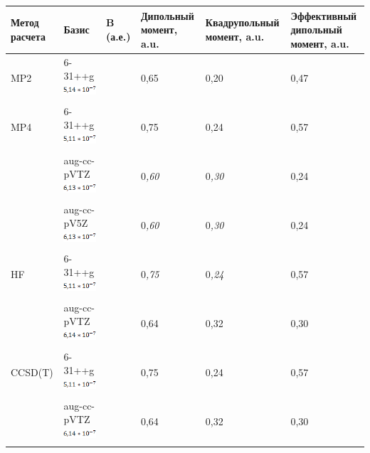 \documentclass{article}
\begin{document}
\vspace{10pt}
\begin{tabular}{|>{\raggedright}p{25pt}|>{\raggedright}p{42pt}|>{\raggedright}p{50pt}|>{\raggedright}p{49pt}|>{\raggedright}p{52pt}|>{\raggedright}p{53pt}|}
\hline
М\textbf{етод расчета} & Б\textbf{азис} & B\textbf{ (а.е.)} & Д\textbf{ипольный 
момент, a.u.} & К\textbf{вадрупольный момент, a.u.} & Э\textbf{ффективный 
дипольный момент, a.u.}\tabularnewline
\hline
MP2 & 6-31++g
\includegraphics[width=54pt, height=15pt, keepaspectratio=true]{7-fig001.png}
 &  & 0,65 & 0,20 & 0,47\tabularnewline
\hline
MP4 & 6-31++g
\includegraphics[width=54pt, height=15pt, keepaspectratio=true]{7-fig002.png}
 &  & 0,75 & 0,24 & 0,57\tabularnewline
\hline
 & aug-cc-pVTZ
\includegraphics[width=54pt, height=15pt, keepaspectratio=true]{7-fig003.png}
 &  & 0\textit{,60} & 0\textit{,30} & 0,24\tabularnewline
\hline
 & aug-cc-pV5Z
\includegraphics[width=54pt, height=15pt, keepaspectratio=true]{7-fig004.png}
 &  & 0\textit{,60} & 0\textit{,30} & 0,24\tabularnewline
\hline
HF & 6-31++g
\includegraphics[width=54pt, height=15pt, keepaspectratio=true]{7-fig005.png}
 &  & 0\textit{,75} & 0\textit{,24} & 0,57\tabularnewline
\hline
 & aug-cc-pVTZ
\includegraphics[width=54pt, height=15pt, keepaspectratio=true]{7-fig006.png}
 &  & 0,64 & 0,32 & 0,30\tabularnewline
\hline
CCSD(T) & 6-31++g
\includegraphics[width=54pt, height=15pt, keepaspectratio=true]{7-fig007.png}
 &  & 0,75 & 0,24 & 0,57\tabularnewline
\hline
 & aug-cc-pVTZ
\includegraphics[width=54pt, height=15pt, keepaspectratio=true]{7-fig008.png}
 &  & 0,64 & 0,32 & 0,30\tabularnewline
\hline
\end{tabular}
\end{document}

